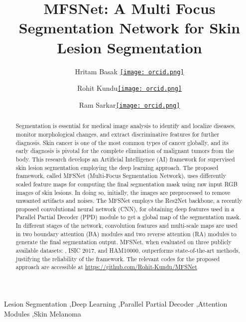 \documentclass[review]{elsarticle}
\newcommand{\orcid}[1]{\href{https://orcid.org/#1}{\texttt{[image: orcid.png]}}}
\begin{document}
\begin{frontmatter}

\title{MFSNet: A Multi Focus Segmentation Network for Skin Lesion Segmentation}

\author[a]{Hritam Basak \orcid{0000-0001-5921-1230}}
\author[a]{Rohit Kundu\orcid{0000-0001-8665-8898}}
\author[b]{Ram Sarkar\orcid{0000-0001-8813-4086}}

\address[a]{Department of Electrical Engineering, Jadavpur University, INDIA}
\address[b]{Department of Computer Science \& Engineering, Jadavpur University, INDIA}

\begin{abstract} 
Segmentation is essential for medical image analysis to identify and localize diseases, monitor morphological changes, and extract discriminative features for further diagnosis. Skin cancer is one of the most common types of cancer globally, and its early diagnosis is pivotal for the complete elimination of malignant tumors from the body. This research develops an Artificial Intelligence (AI) framework for supervised skin lesion segmentation employing the deep learning approach. The proposed framework, called MFSNet (Multi-Focus Segmentation Network), uses differently scaled feature maps for computing the final segmentation mask using raw input RGB images of skin lesions. In doing so, initially, the images are preprocessed to remove unwanted artifacts and noises. The MFSNet employs the Res2Net backbone, a recently proposed convolutional neural network (CNN), for obtaining deep features used in a Parallel Partial Decoder (PPD) module to get a global map of the segmentation mask. In different stages of the network, convolution features and multi-scale maps are used in two boundary attention (BA) modules and two reverse attention (RA) modules to generate the final segmentation output. MFSNet, when evaluated on three publicly available datasets: , ISIC 2017, and HAM10000, outperforms state-of-the-art methods, justifying the reliability of the framework. The relevant codes for the proposed approach are accessible at \url{https://github.com/Rohit-Kundu/MFSNet}
\end{abstract}

\begin{keyword}
Lesion Segmentation \sep Deep Learning \sep Parallel Partial Decoder \sep Attention Modules \sep Skin Melanoma
\end{keyword}
\end{frontmatter}
\end{document}
